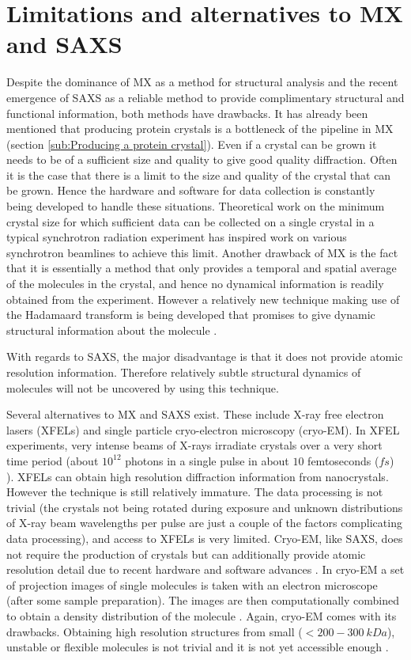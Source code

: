 \section{Limitations and alternatives to MX and SAXS}
\label{sec:Limitations and alternatives to MX and SAXS}
    Despite the dominance of MX as a method for structural analysis and the recent emergence of SAXS as a reliable method to provide complimentary structural and functional information, both methods have drawbacks.
    It has already been mentioned that producing protein crystals is a bottleneck of the pipeline in MX (section \ref{sub:Producing a protein crystal}).
    Even if a crystal can be grown it needs to be of a sufficient size and quality to give good quality diffraction.
    Often it is the case that there is a limit to the size and quality of the crystal that can be grown.
    Hence the hardware and software for data collection is constantly being developed to handle these situations.
    Theoretical work on the minimum crystal size for which sufficient data can be collected on a single crystal in a typical synchrotron radiation experiment \cite{holton2010} has inspired work on various synchrotron beamlines to achieve this limit.
    Another drawback of MX is the fact that it is essentially a method that only provides a temporal and spatial average of the molecules in the crystal, and hence no dynamical information is readily obtained from the experiment.
    However a relatively new technique making use of the Hadamaard transform is being developed that promises to give dynamic structural information about the molecule \cite{yorke2014time}.

    With regards to SAXS, the major disadvantage is that it does not provide atomic resolution information. Therefore relatively subtle structural dynamics of molecules will not be uncovered by using this technique.

    Several alternatives to MX and SAXS exist. These include X-ray free electron lasers (XFELs) and single particle cryo-electron microscopy (cryo-EM).
    In XFEL experiments, very intense beams of X-rays irradiate crystals over a very short time period (about $10^{12}$ photons in a single pulse in about $10$ femtoseconds ($fs$) \cite{chapman2011femtosecond}). XFELs can obtain high resolution diffraction information from nanocrystals.
    However the technique is still relatively immature.
    The data processing is not trivial (the crystals not being rotated during exposure and unknown distributions of X-ray beam wavelengths per pulse are just a couple of the factors complicating data processing), and access to XFELs is very limited.
    Cryo-EM, like SAXS, does not require the production of crystals but can additionally provide atomic resolution detail due to recent hardware and software advances \cite{bai2015cryo}.
    In cryo-EM a set of projection images of single molecules is taken with an electron microscope (after some sample preparation).
    The images are then computationally combined to obtain a density distribution of the molecule \cite{milne2013cryo}.
    Again, cryo-EM comes with its drawbacks. Obtaining high resolution structures from small ($< 200-300\ kDa$), unstable or flexible molecules is not trivial and it is not yet accessible enough \cite{bai2015cryo}.
